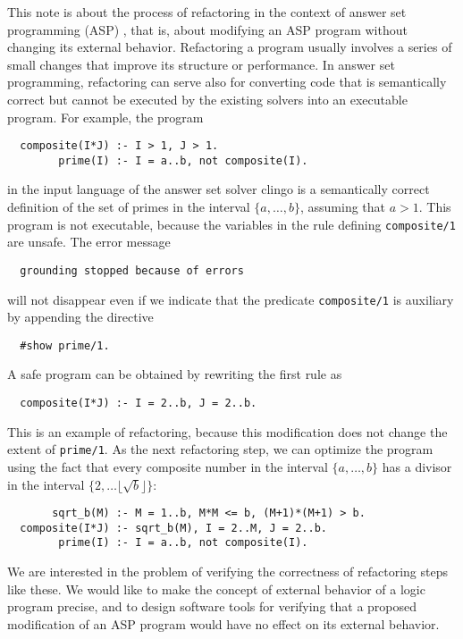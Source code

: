 \documentclass{new_tlp}
\begin{document}
This note is about the process of refactoring in the context of answer set
programming (ASP) \cite{mar99,nie99}, %
that is, about modifying an ASP program without changing
its external behavior.  Refactoring a program usually involves a series of
small changes that improve its structure or performance.  In answer set
programming, refactoring can serve also for converting code that is
semantically correct but cannot be executed by the existing solvers into an
executable program.  For example, the program
\begin{verbatim}
  composite(I*J) :- I > 1, J > 1.
        prime(I) :- I = a..b, not composite(I).
\end{verbatim}
in the input language of the answer set solver {\sc clingo} \cite{geb12}
is a semantically correct definition of the set of primes in the
interval $\{a,\dots,b\}$, assuming that $a>1$.  This program
is not executable, because the variables in
the rule defining \verb|composite/1| are unsafe.  The error message
\begin{verbatim}
  grounding stopped because of errors
\end{verbatim}
will not disappear even if we indicate that the predicate
\verb|composite/1| is auxiliary by appending the directive
\begin{verbatim}
  #show prime/1.
\end{verbatim}
A safe program can be obtained by rewriting the first rule as
\begin{verbatim}
  composite(I*J) :- I = 2..b, J = 2..b.
\end{verbatim}
This is an example of refactoring, because this modification
does not change the extent of \verb|prime/1|.
As the next refactoring step, we can optimize the program using the
fact that every composite
number in the interval $\{a,\dots,b\}$ has a divisor in the interval
$\{2,\dots\lfloor \sqrt b\rfloor\}$:
\begin{verbatim}
       sqrt_b(M) :- M = 1..b, M*M <= b, (M+1)*(M+1) > b.
  composite(I*J) :- sqrt_b(M), I = 2..M, J = 2..b.
        prime(I) :- I = a..b, not composite(I).
\end{verbatim}

We are interested in the problem of verifying the correctness of
refactoring steps like these. We would like to make the concept of external
behavior of a logic program precise, and to
design software tools for verifying that a proposed modification of an
ASP program would have no effect on its external behavior.
\end{document}
